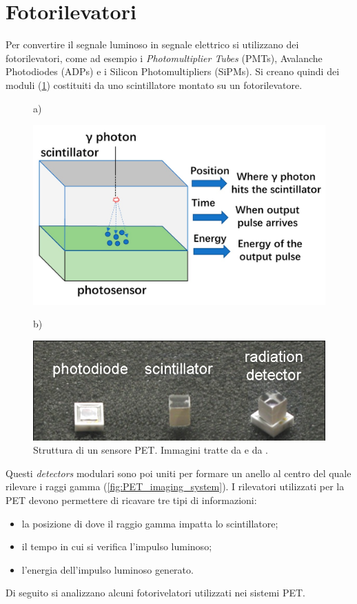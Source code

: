 \section{Fotorilevatori}
Per convertire il segnale luminoso in segnale elettrico si utilizzano dei fotorilevatori, come ad esempio i \textit{Photomultiplier Tubes} (PMTs), Avalanche Photodiodes (ADPs) e i Silicon Photomultipliers (SiPMs). Si creano quindi dei moduli (\Fig\ref{fig:photodetectors}) costituiti da uno scintillatore montato su un fotorilevatore.
\begin{figure}[tbh]
	\centering
	a)
	\begin{minipage}{.45\textwidth}
		\includegraphics[width=\linewidth]{./ImageFiles/PET_detectors.jpg}
	\end{minipage}
	b)
	\begin{minipage}{.45\textwidth}
		\includegraphics[width=\linewidth]{./ImageFiles/PET_detectors_real.jpg}
	\end{minipage}
	\caption{Struttura di un sensore PET. Immagini tratte da \cite{Jiang2019} e da \cite{Spanoudaki2010}.}
	\label{fig:photodetectors}
\end{figure}
Questi \textit{detectors} modulari sono poi uniti per formare un anello al centro del quale rilevare i raggi gamma (\Fig\ref{fig:PET_imaging_system}). I rilevatori utilizzati per la PET devono permettere di ricavare tre tipi di informazioni:
\begin{itemize}
	\item la posizione di dove il raggio gamma impatta lo scintillatore;
	\item il tempo in cui si verifica l'impulso luminoso;
	\item l'energia dell'impulso luminoso generato.
\end{itemize}
Di seguito si analizzano alcuni fotorivelatori utilizzati nei sistemi PET.
